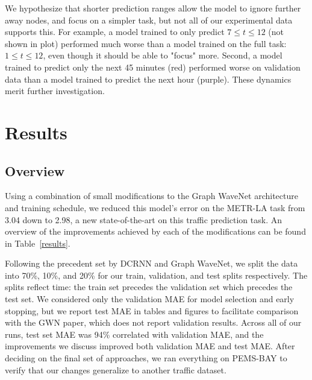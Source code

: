 \documentclass[10pt]{article}
\begin{document}
We hypothesize that shorter prediction ranges allow the model to ignore further away nodes, and focus on a simpler task, but not all of our experimental data supports this. For example, a model trained to only predict $7 \leq t \leq 12$ (not shown in plot) performed much worse than a model trained on the full task: $1 \leq t \leq 12$, even though it should be able to "focus" more. Second, a model trained to predict only the next 45 minutes (red) performed worse on validation data than a model trained to predict the next hour (purple). These dynamics merit further investigation.

\section{Results}

\subsection{Overview}
Using a combination of small modifications to the Graph WaveNet architecture and training schedule, we reduced this model's error on the METR-LA task from 3.04 down to 2.98, a new state-of-the-art on this traffic prediction task. An overview of the improvements achieved by each of the modifications can be found in Table~\ref{results}.

Following the precedent set by DCRNN and Graph WaveNet, we split the data into 70\%, 10\%, and 20\% for our train, validation, and test splits respectively. The splits reflect time: the train set precedes the validation set which precedes the test set. We considered only the validation MAE for model selection and early stopping, but we report test MAE in tables and figures to facilitate comparison with the GWN paper, which does not report validation results. Across all of our runs, test set MAE was 94\% correlated with validation MAE, and the improvements we discuss improved both validation MAE and test MAE. After deciding on the final set of approaches, we ran everything on PEMS-BAY to verify that our changes generalize to another traffic dataset.
\end{document}
